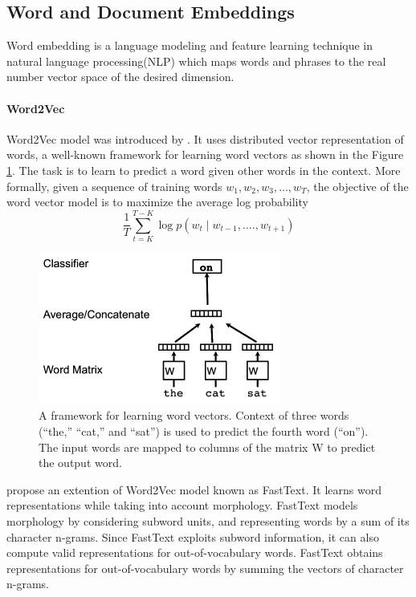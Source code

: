 \subsection{Word and Document Embeddings} 
Word embedding is a language modeling and feature learning technique in natural language processing(NLP) which maps words and phrases to the real number vector space of the desired dimension. 

\paragraph{Word2Vec} Word2Vec model was  introduced by \citet{mikolov2013efficient}. It uses distributed vector representation of words, a well-known framework for learning word vectors as shown in the Figure \ref{fig:Word2Vec model}. The task is to learn to predict a word given other words in the context.
More formally, given a sequence of training words
$w_{1}, w_{2}, w_{3}, ..., w_{T} $, the objective of the word vector model is to maximize the average log probability
\\
\begin{equation}
\frac{1}{T} \sum_{t=K}^{T-K} \log p(w_{t} \mid w_{t-1},....,w_{t+1}) 
\end{equation}

\begin{figure}[h]
	\centering
	\includegraphics[width=8cm, height=5cm]{w2v.png}
	\caption{A framework for learning word vectors. Context of
		three words (“the,” “cat,” and “sat”) is used to predict the fourth
		word (“on”). The input words are mapped to columns of the matrix
		W to predict the output word.}
	\label{fig:Word2Vec model}
\end{figure}


 \citet{bojanowski2016enriching} propose an extention of Word2Vec model known as FastText. It learns word
 representations while taking into account morphology.
 FastText models morphology by considering subword
 units, and representing words by a sum of its character
 n-grams.  Since FastText exploits subword information, it can also
 compute valid representations for out-of-vocabulary
 words. FastText obtains representations for out-of-vocabulary words by summing the vectors of character
 n-grams.
  
